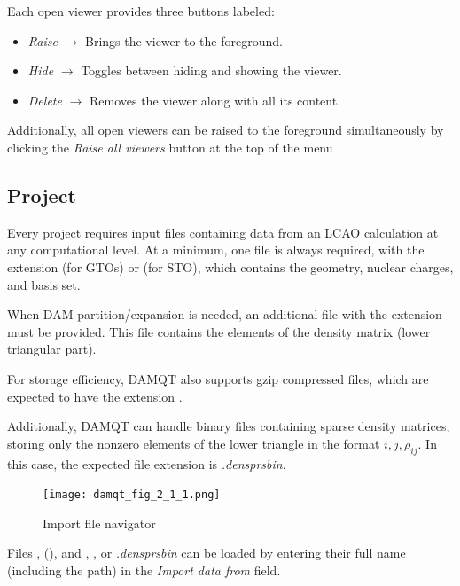 \documentclass[10pt]{article}
\begin{document}
Each open viewer provides three buttons labeled:
\begin{itemize}
\item {\it Raise} $\rightarrow$ Brings the viewer to the foreground.
\item {\it Hide} $\rightarrow$ Toggles between hiding and showing the viewer.
\item {\it Delete} $\rightarrow$ Removes the viewer along with all its content.
\end{itemize}

Additionally, all open viewers can be raised to the foreground simultaneously
by clicking the {\it Raise all viewers} button at the top of the menu


\subsection{Project \label{sec:2.1}}


Every project requires input files containing data from an LCAO calculation at any computational level.
At a minimum, one file is always required, with the extension \ggbs{} (for GTOs) or
\sgbs{} (for STO), which contains the geometry, nuclear charges, and basis set.

When DAM partition/expansion is needed, an additional file with the extension \den{}
must be provided. This file contains the elements of the density matrix (lower triangular part).

For storage efficiency, DAMQT also supports gzip compressed \den{} files,
which are expected to have the extension \dengz{}.

Additionally, DAMQT can handle binary files containing sparse density matrices,
storing only the nonzero elements of the lower triangle in the format $i,j,\rho_{ij}$.
In this case, the expected file extension is {\it .densprsbin}.


\begin{figure}[H]
\begin{center}
\texttt{[image: damqt\_fig\_2\_1\_1.png]}
\end{center}
\caption{Import file navigator \label{fig:2_1_1}}
\end{figure}

Files \ggbs{ }, (\sgbs{ }), and \den{ }, \dengz{ }, or {\it .densprsbin}
can be loaded by entering their full name (including the path)
in the {\it Import data from} field.
\end{document}
